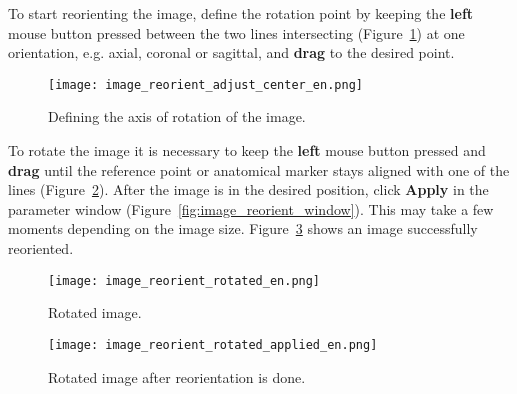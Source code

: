 To start reorienting the image, define the rotation point by keeping the \textbf{left} mouse button pressed between the two lines intersecting (Figure~\ref{fig:image_reorient_adjust_center}) at one orientation, e.g. axial, coronal or sagittal, and \textbf{drag} to the desired point.

\begin{figure}[!htb]
\centering
\texttt{[image: image\_reorient\_adjust\_center\_en.png]}
\caption{Defining the axis of rotation of the image.}
\label{fig:image_reorient_adjust_center}
\end{figure}

To rotate the image it is necessary to keep the \textbf{left} mouse button pressed and \textbf{drag} until the reference point or anatomical marker stays aligned with one of the lines (Figure~\ref{fig:image_reorient_rotated}). After the image is in the desired position, click \textbf{Apply} in the parameter window (Figure~\ref{fig:image_reorient_window}). This may take a few moments depending on the image size. Figure~\ref{fig:image_reorient_rotated_applied} shows an image successfully reoriented.

\begin{figure}[!htb]
\centering
\texttt{[image: image\_reorient\_rotated\_en.png]}
\caption{Rotated image.}
\label{fig:image_reorient_rotated}
\end{figure}

\begin{figure}[!htb]
\centering
\texttt{[image: image\_reorient\_rotated\_applied\_en.png]}
\caption{Rotated image after reorientation is done.}
\label{fig:image_reorient_rotated_applied}
\end{figure}
